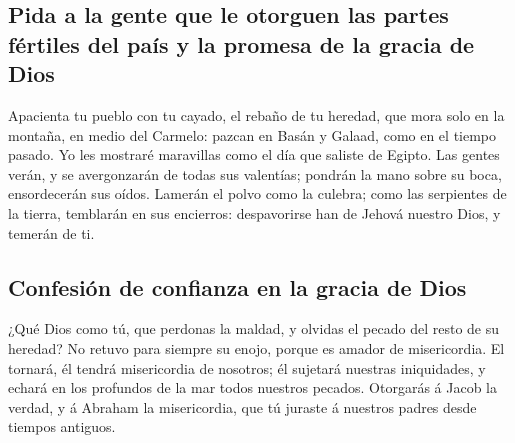\hypertarget{pida-a-la-gente-que-le-otorguen-las-partes-fuxe9rtiles-del-pauxeds-y-la-promesa-de-la-gracia-de-dios}{%
\subsection{Pida a la gente que le otorguen las partes fértiles del país
y la promesa de la gracia de
Dios}\label{pida-a-la-gente-que-le-otorguen-las-partes-fuxe9rtiles-del-pauxeds-y-la-promesa-de-la-gracia-de-dios}}

 Apacienta tu pueblo con tu cayado, el rebaño de tu
heredad, que mora solo en la montaña, en medio del Carmelo: pazcan en
Basán y Galaad, como en el tiempo pasado.  Yo les mostraré
maravillas como el día que saliste de Egipto.  Las gentes
verán, y se avergonzarán de todas sus valentías; pondrán la mano sobre
su boca, ensordecerán sus oídos.  Lamerán el polvo como la
culebra; como las serpientes de la tierra, temblarán en sus encierros:
despavorirse han de Jehová nuestro Dios, y temerán de ti.

\hypertarget{confesiuxf3n-de-confianza-en-la-gracia-de-dios}{%
\subsection{Confesión de confianza en la gracia de
Dios}\label{confesiuxf3n-de-confianza-en-la-gracia-de-dios}}

 ¿Qué Dios como tú, que perdonas la maldad, y olvidas el
pecado del resto de su heredad? No retuvo para siempre su enojo, porque
es amador de misericordia.  El tornará, él tendrá
misericordia de nosotros; él sujetará nuestras iniquidades, y echará en
los profundos de la mar todos nuestros pecados.  Otorgarás
á Jacob la verdad, y á Abraham la misericordia, que tú juraste á
nuestros padres desde tiempos antiguos.
